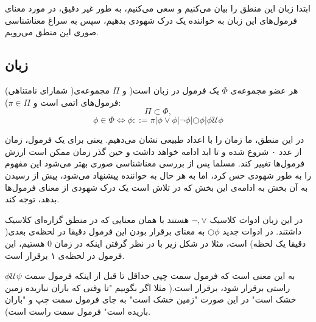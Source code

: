 ابتدا زبان این منطق را بیان می‌کنیم و سعی می‌کنیم، به طور غیر دقیق، در مورد معنای فرمول‌های این زبان به خواننده یک درک شهودی بدهیم، سپس به سراغ معناشناسی صوری این منطق می‌رویم.

\subsection{زبان }
\begin{defn}
	هر عضو مجموعه‌ی $\Phi$ یک فرمول در زبان  است( و $\Pi$ مجموعه‌ی‌( شمارای نامتناهی) فرمول‌های اتمی است و $\pi \in \Pi$):
	$$
	\Pi \subset \Phi,
	$$
	$$
	\phi \in \Phi \Leftrightarrow
	\phi ::= \pi | \phi \lor \phi |
	\neg \phi |
	\bigcirc \phi |
	\phi \mathcal{U}\phi 
$$	
	
\end{defn}
در این منطق، ما زمان را با اعداد طبیعی نشان می‌دهیم. یعنی برای یک فرمول، زمان از عدد ۰ شروع شده و تا ابد ادامه خواهد داشت و حین گذر زمان ممکن است ارزش فرمول‌ها تغییر کند. مسلما پس از بررسی معناشناسی صوری بهتر می‌شود این مفهوم را به طور شهودی حس کرد، اما به هر حال به خواننده پیشنهاد می‌شود، پیش از رسیدن به آن بخش به ادامه‌ی این بخش که در تلاش است یک درک شهودی از معنای فرمول‌ها بدهد، توجه کند. 

در این زبان ادوات کلاسیک 
$\neg, \lor$
هستند با همان معنایی که در منطق گزاره‌ای کلاسیک داشتند.  
در ادوات جدید 
$\bigcirc \phi$
به معنای برقرار بودن این فرمول دقیقا در لحظه‌ی بعدی( دقیقا یک لحظه) است، مثلا در شکل زیر با در نظر گرفتن اینکه در زمان 0 هستیم، این فرمول در لحظه‌ی ۱ برقرار است.
	\begin{center}
\end{center}
$\phi \mathcal{U}\psi$
به این معنی است که فرمول سمت چپی حداقل تا قبل از اینکه فرمول سمت راستی برقرار شود، برقرار است.( مثلا اگر بگوییم "تا وقتی که باران نباریده زمین خشک است" در این صورت "زمین خشک است" به جای فرمول سمت چپ و "باران باریده است" فرمول سمت راست است).
\begin{center}
\end{center}

